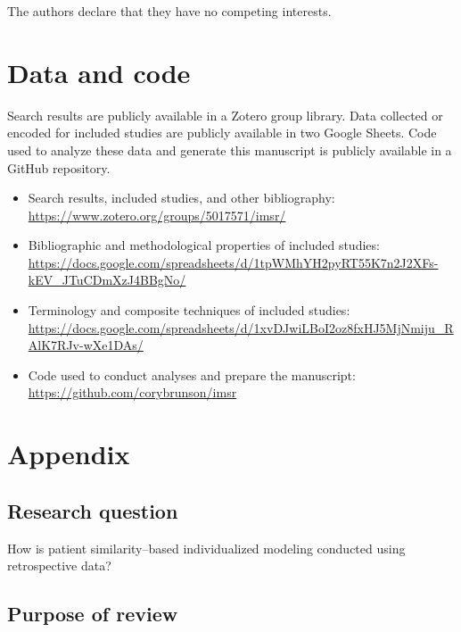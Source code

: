 \documentclass[preprint, 3p,
authoryear]{elsarticle} %
\providecommand{\tightlist}{%
  \setlength{\itemsep}{0pt}\setlength{\parskip}{0pt}}
\begin{document}
The authors declare that they have no competing interests.

\hypertarget{data-and-code}{%
\section{Data and code}\label{data-and-code}}

\label{sec:data}

Search results are publicly available in a Zotero group library. Data
collected or encoded for included studies are publicly available in two
Google Sheets. Code used to analyze these data and generate this
manuscript is publicly available in a GitHub repository.

\begin{itemize}
\tightlist
\item
  Search results, included studies, and other bibliography:
  \url{https://www.zotero.org/groups/5017571/imsr/}
\item
  Bibliographic and methodological properties of included studies:
  \url{https://docs.google.com/spreadsheets/d/1tpWMhYH2pyRT55K7n2J2XFs-kEV_JTuCDmXzJ4BBgNo/}
\item
  Terminology and composite techniques of included studies:
  \url{https://docs.google.com/spreadsheets/d/1xvDJwiLBoI2oz8fxHJ5MjNmiju_RAlK7RJv-wXe1DAs/}
\item
  Code used to conduct analyses and prepare the manuscript:
  \url{https://github.com/corybrunson/imsr}
\end{itemize}

\hypertarget{appendix}{%
\section{Appendix}\label{appendix}}

\hypertarget{research-question}{%
\subsection{Research question}\label{research-question}}

How is patient similarity--based individualized modeling conducted using
retrospective data?

\hypertarget{purpose-of-review}{%
\subsection{Purpose of review}\label{purpose-of-review}}

\label{sec:appendix-purpose}
\end{document}
